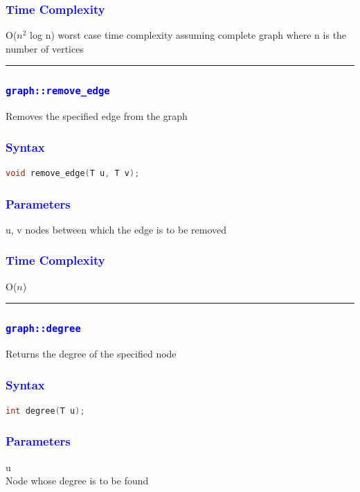 \documentclass[11pt,a4paper]{article}
\begin{document}
\subsubsection*{\textcolor{blue}{ \large {Time Complexity}}}
O($n^2$ log n) worst case time complexity assuming complete graph where n is the number of vertices
\\
\rule{17cm}{0.1mm}



\subsubsection*{\textcolor{blue}{ \Large \texttt{graph::remove\_edge}}}
Removes the specified edge from the graph

\subsubsection*{\textcolor{blue}{ \large {Syntax}}}
\begin{lstlisting}[language=C++]
 void remove_edge(T u, T v);

\end{lstlisting}
\subsubsection*{\textcolor{blue}{ \large {Parameters
}}}
u, v nodes between which the edge is to be removed


\subsubsection*{\textcolor{blue}{ \large {Time Complexity}}}
O($n$) 
\\
\rule{17cm}{0.1mm}


\subsubsection*{\textcolor{blue}{ \Large \texttt{graph::degree}}}
Returns the degree of the specified node

\subsubsection*{\textcolor{blue}{ \large {Syntax}}}
\begin{lstlisting}[language=C++]
int degree(T u);

\end{lstlisting}
\subsubsection*{\textcolor{blue}{ \large {Parameters
}}}
u \\
Node whose degree is to be found
\end{document}
